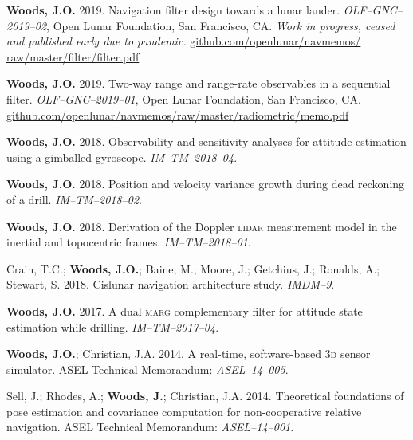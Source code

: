 \documentclass[12pt,letterpaper]{article}
\begin{document}
\medskip
\par\textbf{Woods, J.O.} 2019. Navigation filter design towards a lunar lander. \textit{OLF--GNC--2019--02}, Open Lunar Foundation, San Francisco, CA. \textit{Work in progress, ceased and published early due to pandemic.} \href{https://github.com/openlunar/navmemos/raw/master/filter/filter.pdf}{github.com/openlunar/navmemos/ raw/master/filter/filter.pdf}

\medskip
\par\textbf{Woods, J.O.} 2019. Two-way range and range-rate observables in a sequential filter. \textit{OLF--GNC--2019--01}, Open Lunar Foundation, San Francisco, CA. \href{https://github.com/openlunar/navmemos/raw/master/radiometric/memo.pdf}{github.com/openlunar/navmemos/raw/master/radiometric/memo.pdf}

\medskip
\par\textbf{Woods, J.O.} 2018. Observability and sensitivity analyses for attitude estimation using a gimballed gyroscope. \textit{IM--TM--2018--04}.

\medskip
\par \textbf{Woods, J.O.} 2018. Position and velocity variance growth during dead reckoning of a drill. \textit{IM--TM--2018--02}.

\medskip
\par \textbf{Woods, J.O.} 2018. Derivation of the Doppler \textsc{lidar} measurement model in the inertial and topocentric frames. \textit{IM--TM--2018--01}.

\medskip
\par Crain, T.C.; \textbf{Woods, J.O.}; Baine, M.; Moore, J.; Getchius, J.; Ronalds, A.; Stewart, S. 2018. Cislunar navigation architecture study. \textit{IMDM--9}.

\medskip
\par \textbf{Woods, J.O.} 2017. A dual \textsc{marg} complementary filter for attitude state estimation while drilling. \textit{IM--TM--2017--04}.

\medskip
\par \textbf{Woods, J.O.}; Christian, J.A. 2014. A real-time, software-based \textsc{3d} sensor simulator. ASEL Technical Memorandum: \textit{ASEL--14--005}.

\medskip
\par Sell, J.; Rhodes, A.; \textbf{Woods, J.}; Christian, J.A. 2014. Theoretical foundations of pose estimation and covariance computation for non-cooperative relative navigation. ASEL Technical Memorandum: \textit{ASEL--14--001}.
\end{document}
